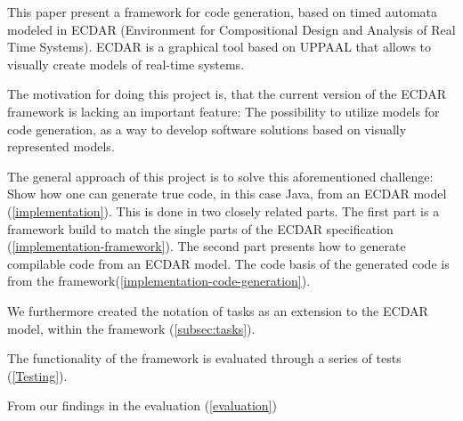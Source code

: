 This paper present a framework for code generation, based on timed automata modeled in ECDAR (Environment for Compositional Design and Analysis of Real Time Systems). ECDAR is a graphical tool based on UPPAAL that allows to visually create models of real-time systems.

The motivation for doing this project is, that the current version of the ECDAR framework is lacking an important feature: The possibility to utilize models for code generation, as a way to develop software solutions based on visually represented models.

The general approach of this project is to solve this aforementioned challenge: Show how one can generate true code, in this case Java, from an ECDAR model (\ref{implementation}). This is done in two closely related parts. The first part is a framework build to match the single parts of the ECDAR specification (\ref{implementation-framework}). The second part presents how to generate compilable code from an ECDAR model. The code basis of the generated code is from the framework(\ref{implementation-code-generation}). 

We furthermore created the notation of tasks as an extension to the ECDAR model, within the framework (\ref{subsec:tasks}). 

The functionality of the framework is evaluated through a series of tests (\ref{Testing}). 

From our findings in the evaluation (\ref{evaluation}) 
